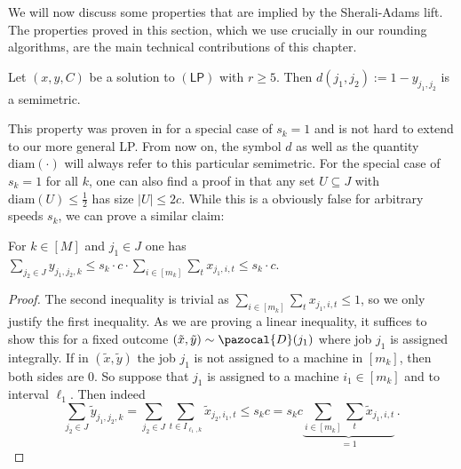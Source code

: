   We will now discuss some properties that are implied by the Sherali-Adams lift.
  The properties proved in this section, which we use crucially in our rounding algorithms, are the main technical contributions of this chapter.
  
  \begin{lemma}\label{lem:Relmetric}
  Let $(x,y,C)$ be a solution to $(\mathsf{LP})$ with $r \geq 5$. Then $d(j_1,j_2) := 1-y_{j_1,j_2}$ is a semimetric.
  \end{lemma}
  This property was proven in \cite{DKRTZ20} for a special case of $s_k = 1$
  and is not hard to extend to our more general LP. From now on, the symbol $d$ as well as the quantity $\textrm{diam}( \cdot )$ will always refer to this particular semimetric. 
  For the special case of $s_k = 1$ for all $k$, one can also find a proof in \cite{DKRTZ20} that any set $U \subseteq J$ with $\textrm{diam}(U) \leq \frac{1}{2}$ has size $|U| \leq 2c$.
  While this is a obviously false for arbitrary speeds $s_k$, we can prove a similar claim: 
  \begin{lemma} \label{lem:BoundSumOfYj1j2kForFixedJ1}
  For $k \in [M]$ and $j_1 \in J$ one has $\sum_{j_2 \in J} y_{j_1,j_2,k} \leq s_k \cdot c \cdot \sum_{i \in [m_k]}\sum_{t}
  x_{j_1,i,t} \leq s_k \cdot c$.
  \end{lemma}
  \begin{proof}
    The second inequality is trivial as $\sum_{i \in [m_k]} \sum_{t} x_{j_1,i,t} \leq 1$, so we only justify the first inequality. 
  As we are proving a linear inequality, it suffices to show this for a fixed outcome $(\tilde{x},\tilde{y}) \sim \pazocal{D}(j_1)$ where job $j_1$ is assigned integrally. 
  If in $(\tilde{x},\tilde{y})$ the job $j_1$ is not assigned to a machine in $[m_k]$, then both sides are 0. 
  So suppose that $j_1$ is assigned to a machine $i_1 \in [m_k]$ and to interval $\ell_1$.
  Then indeed
  \[
  \sum_{j_2 \in J} \tilde{y}_{j_1,j_2,k} = \sum_{j_2 \in J} \sum_{t \in I_{\ell_1,k}} \tilde{x}_{j_2,i_1,t} \leq s_k c = s_k c \underbrace{\sum_{i \in [m_k]}\sum_{t} \tilde{x}_{j_1,i,t}}_{=1}
  \,.
  \]
  \end{proof}
  
